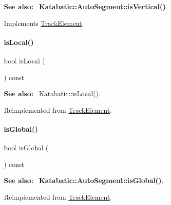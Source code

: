 {\bfseries See also\+:}~ \textbf{ Katabatic\+::\+Auto\+Segment\+::is\+Vertical()}. 

Implements \hyperlink{classKite_1_1TrackElement_a6fa2bf0568a2b295dd7cd1f7207247d5}{Track\+Element}.

\mbox{\label{classKite_1_1TrackSegment_add556a145a89fdbcea82346abfb873dc}} 
\paragraph{\texorpdfstring{is\+Local()}{isLocal()}}
{\footnotesize\ttfamily bool is\+Local (\begin{DoxyParamCaption}{ }\end{DoxyParamCaption}) const\hspace{0.3cm}{\ttfamily [virtual]}}

{\bfseries See also\+:}~ Katabatic\+::is\+Local(). 

Reimplemented from \hyperlink{classKite_1_1TrackElement_add556a145a89fdbcea82346abfb873dc}{Track\+Element}.

\mbox{\label{classKite_1_1TrackSegment_a19ba379112d6b29faa45c5eefbf38500}} 
\paragraph{\texorpdfstring{is\+Global()}{isGlobal()}}
{\footnotesize\ttfamily bool is\+Global (\begin{DoxyParamCaption}{ }\end{DoxyParamCaption}) const\hspace{0.3cm}{\ttfamily [virtual]}}

{\bfseries See also\+:}~ \textbf{ Katabatic\+::\+Auto\+Segment\+::is\+Global()}. 

Reimplemented from \hyperlink{classKite_1_1TrackElement_a19ba379112d6b29faa45c5eefbf38500}{Track\+Element}.

\mbox{\label{classKite_1_1TrackSegment_a72741158d19af38e84c5e9c08f91270f}} 
